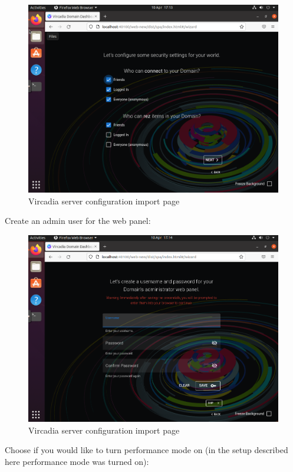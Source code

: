 \begin{figure}
\centering
\includegraphics{Vircadia4.png}
\caption{Vircadia server configuration import page}
\end{figure}

Create an admin user for the web panel:

\begin{figure}
\centering
\includegraphics{Vircadia5.png}
\caption{Vircadia server configuration import page}
\end{figure}

Choose if you would like to turn performance mode on (in the setup
described here performance mode was turned on):


